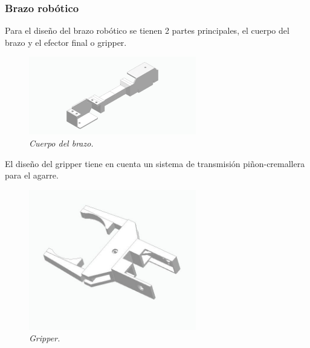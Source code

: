\subsubsection{Brazo robótico}
Para el diseño del brazo robótico se tienen 2 partes principales, el cuerpo del brazo y el efector final o gripper. \\
\begin{figure}[H]
    \centering
\includegraphics[width=0.65\textwidth]{img/brazo_medio.jpg} \par
    \caption{\textit{Cuerpo del brazo.}}
    \label{fig:brazo}
\end{figure}
El diseño del gripper tiene en cuenta un sistema de transmisión piñon-cremallera para el agarre. 
\begin{figure}[H]
    \centering
\includegraphics[width=0.65\textwidth]{img/pinza.jpg} \par
    \caption{\textit{Gripper.}}
    \label{fig:brazo}
\end{figure}


